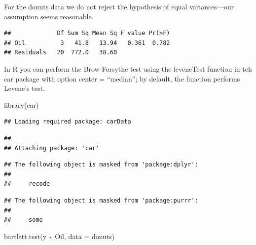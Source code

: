 \documentclass[
]{book}
\newenvironment{Shaded}{\begin{snugshade}}{\end{snugshade}}
\newcommand{\AttributeTok}[1]{\textcolor[rgb]{0.77,0.63,0.00}{#1}}
\newcommand{\FunctionTok}[1]{\textcolor[rgb]{0.00,0.00,0.00}{#1}}
\newcommand{\NormalTok}[1]{#1}
\newcommand{\OtherTok}[1]{\textcolor[rgb]{0.56,0.35,0.01}{#1}}
\newcommand{\SpecialCharTok}[1]{\textcolor[rgb]{0.00,0.00,0.00}{#1}}
\begin{document}
For the donuts data we do not reject the hypothesis of equal variances---our assumption seems reasonable.

\begin{Shaded}
\end{Shaded}

\begin{verbatim}
##             Df Sum Sq Mean Sq F value Pr(>F)
## Oil          3   41.8   13.94   0.361  0.782
## Residuals   20  772.0   38.60
\end{verbatim}

In R you can perform the Brow-Forsythe test using the leveneTest function in teh car package with option center = ``median''; by default, the function performs Levene's test.

\begin{Shaded}
\begin{Highlighting}[]
\FunctionTok{library}\NormalTok{(car)}
\end{Highlighting}
\end{Shaded}

\begin{verbatim}
## Loading required package: carData
\end{verbatim}

\begin{verbatim}
## 
## Attaching package: 'car'
\end{verbatim}

\begin{verbatim}
## The following object is masked from 'package:dplyr':
## 
##     recode
\end{verbatim}

\begin{verbatim}
## The following object is masked from 'package:purrr':
## 
##     some
\end{verbatim}

\begin{Shaded}
\begin{Highlighting}[]
\FunctionTok{bartlett.test}\NormalTok{(y }\SpecialCharTok{\textasciitilde{}}\NormalTok{ Oil, }\AttributeTok{data =}\NormalTok{ donuts)}
\end{Highlighting}
\end{Shaded}
\end{document}
